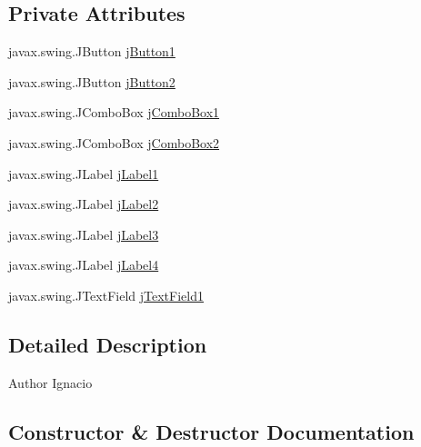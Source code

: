 \subsection*{Private Attributes}
\begin{DoxyCompactItemize}
\item 
javax.\+swing.\+J\+Button \mbox{\hyperlink{classejercicio2_1_1_automovil_interfaz_a75207245626e5d71c200b02b55319a87}{j\+Button1}}
\item 
javax.\+swing.\+J\+Button \mbox{\hyperlink{classejercicio2_1_1_automovil_interfaz_ac92a1987525c5e7afa6eee2ae7d74787}{j\+Button2}}
\item 
javax.\+swing.\+J\+Combo\+Box \mbox{\hyperlink{classejercicio2_1_1_automovil_interfaz_af9e55c9052d02aceba060beb8283c4f2}{j\+Combo\+Box1}}
\item 
javax.\+swing.\+J\+Combo\+Box \mbox{\hyperlink{classejercicio2_1_1_automovil_interfaz_a787595d150a8ebd65cb621823b577788}{j\+Combo\+Box2}}
\item 
javax.\+swing.\+J\+Label \mbox{\hyperlink{classejercicio2_1_1_automovil_interfaz_abccabae7351cdfccc4d45b6dc07461d1}{j\+Label1}}
\item 
javax.\+swing.\+J\+Label \mbox{\hyperlink{classejercicio2_1_1_automovil_interfaz_a70af4ec3e989a5ed4b835e00e84690c8}{j\+Label2}}
\item 
javax.\+swing.\+J\+Label \mbox{\hyperlink{classejercicio2_1_1_automovil_interfaz_aa01e4eef9c730b99950e3bbce2ecd80d}{j\+Label3}}
\item 
javax.\+swing.\+J\+Label \mbox{\hyperlink{classejercicio2_1_1_automovil_interfaz_a67df57d2820e5dcd5af770822ec0c59f}{j\+Label4}}
\item 
javax.\+swing.\+J\+Text\+Field \mbox{\hyperlink{classejercicio2_1_1_automovil_interfaz_a3775261058e376ada92aa378228174d1}{j\+Text\+Field1}}
\end{DoxyCompactItemize}


\subsection{Detailed Description}
\begin{DoxyAuthor}{Author}
Ignacio 
\end{DoxyAuthor}


\subsection{Constructor \& Destructor Documentation}
\mbox{\label{classejercicio2_1_1_automovil_interfaz_a0ebeee030ec43693c371da3b68222644}} 
